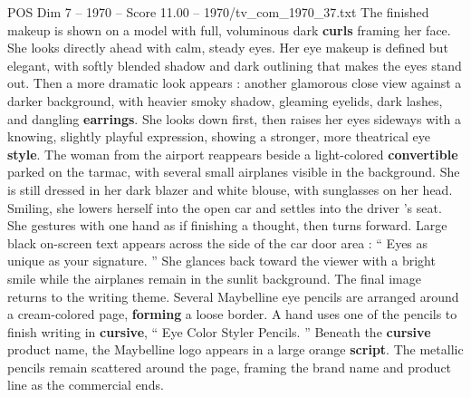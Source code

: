 \begin{textsample}{POS Dim 7 – 1970 – Score 11.00 – 1970/tv\_com\_1970\_37.txt}
The finished makeup is shown on a model with full, voluminous dark \textbf{curls} framing her face.
She looks directly ahead with calm, steady eyes.
Her eye makeup is defined but elegant, with softly blended shadow and dark outlining that makes the eyes stand out.
Then a more dramatic look appears : another glamorous close view against a darker background, with heavier smoky shadow, gleaming eyelids, dark lashes, and dangling \textbf{earrings}.
She looks down first, then raises her eyes sideways with a knowing, slightly playful expression, showing a stronger, more theatrical eye \textbf{style}.
The woman from the airport reappears beside a light-colored \textbf{convertible} parked on the tarmac, with several small airplanes visible in the background.
She is still dressed in her dark blazer and white blouse, with sunglasses on her head.
Smiling, she lowers herself into the open car and settles into the driver ’s seat.
She gestures with one hand as if finishing a thought, then turns forward.
Large black on-screen text appears across the side of the car door area : “ Eyes as unique as your signature. ” She glances back toward the viewer with a bright smile while the airplanes remain in the sunlit background.
The final image returns to the writing theme.
Several Maybelline eye pencils are arranged around a cream-colored page, \textbf{forming} a loose border.
A hand uses one of the pencils to finish writing in \textbf{cursive}, “ Eye Color Styler Pencils. ” Beneath the \textbf{cursive} product name, the Maybelline logo appears in a large orange \textbf{script}.
The metallic pencils remain scattered around the page, framing the brand name and product line as the commercial ends.

\end{textsample}
